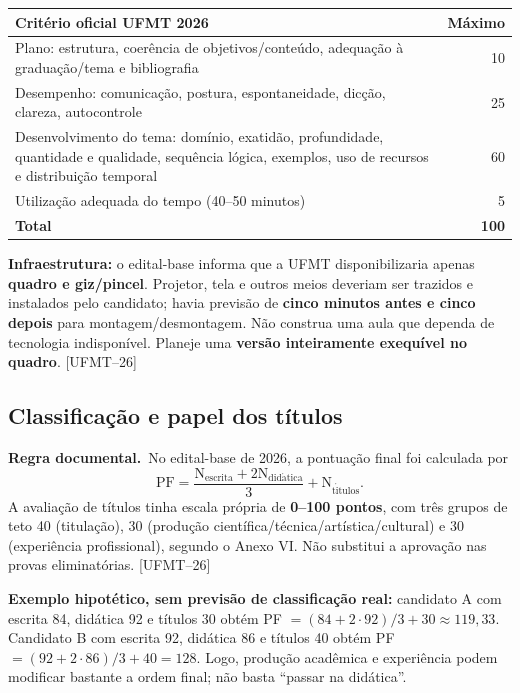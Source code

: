\documentclass[11pt,a4paper]{article}
\newcommand{\oficial}{\textbf{Regra documental.}~}
\newcommand{\fufmt}{\textsf{[UFMT--26]}}
\begin{document}
\begin{tabularx}{\textwidth}{Xr}
\toprule
\textbf{Critério oficial UFMT 2026} & \textbf{Máximo}\\\midrule
Plano: estrutura, coerência de objetivos/conteúdo, adequação à graduação/tema e bibliografia & 10\\
Desempenho: comunicação, postura, espontaneidade, dicção, clareza, autocontrole & 25\\
Desenvolvimento do tema: domínio, exatidão, profundidade, quantidade e qualidade, sequência lógica, exemplos, uso de recursos e distribuição temporal & 60\\
Utilização adequada do tempo (40--50 minutos) & 5\\\midrule
\textbf{Total} & \textbf{100}\\\bottomrule
\end{tabularx}

\begin{cuidado}
\textbf{Infraestrutura:} o edital-base informa que a UFMT disponibilizaria apenas \textbf{quadro e giz/pincel}. Projetor, tela e outros meios deveriam ser trazidos e instalados pelo candidato; havia previsão de \textbf{cinco minutos antes e cinco depois} para montagem/desmontagem. Não construa uma aula que dependa de tecnologia indisponível. Planeje uma \textbf{versão inteiramente exequível no quadro}. \fufmt
\end{cuidado}

\subsection{Classificação e papel dos títulos}
\oficial No edital-base de 2026, a pontuação final foi calculada por
\[
\boxed{\mathrm{PF}=\frac{\mathrm{N}_{\mathrm{escrita}}+2\mathrm{N}_{\mathrm{did\acute{a}tica}}}{3}+\mathrm{N}_{\mathrm{t\acute{i}tulos}}.}
\]
A avaliação de títulos tinha escala própria de \textbf{0--100 pontos}, com três grupos de teto 40 (titulação), 30 (produção científica/técnica/artística/cultural) e 30 (experiência profissional), segundo o Anexo VI. Não substitui a aprovação nas provas eliminatórias. \fufmt

\textbf{Exemplo hipotético, sem previsão de classificação real:} candidato A com escrita 84, didática 92 e títulos 30 obtém PF $=(84+2\cdot92)/3+30\approx119{,}33$. Candidato B com escrita 92, didática 86 e títulos 40 obtém PF $=(92+2\cdot86)/3+40=128$. Logo, produção acadêmica e experiência podem modificar bastante a ordem final; não basta ``passar na didática''.
\end{document}
